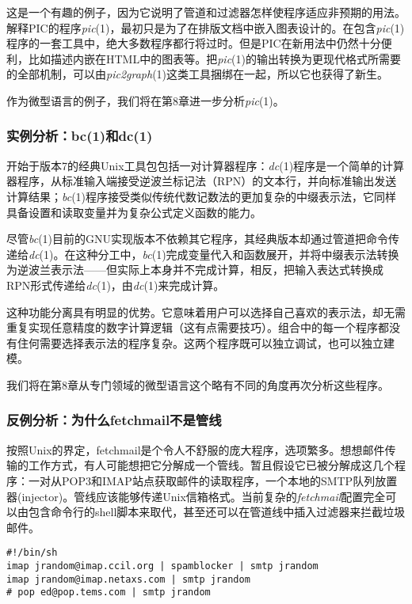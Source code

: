 \documentclass[12pt,oneside]{book}
\begin{document}
\begin{common-format}
这是一个有趣的例子，因为它说明了管道和过滤器怎样使程序适应非预期的用法。解释PIC的程序\textit{pic}(1)，最初只是为了在排版文档中嵌入图表设计的。在包含\textit{pic}(1)程序的一套工具中，绝大多数程序都行将过时。但是PIC在新用法中仍然十分便利，比如描述内嵌在HTML中的图表等。把\textit{pic}(1)的输出转换为更现代格式所需要的全部机制，可以由\textit{pic2graph}(1)这类工具捆绑在一起，所以它也获得了新生。

作为微型语言的例子，我们将在第8章进一步分析\textit{pic}(1)。

\subsubsection{实例分析：bc(1)和dc(1)}
开始于版本7的经典Unix工具包包括一对计算器程序：\textit{dc}(1)程序是一个简单的计算器程序，从标准输入端接受逆波兰标记法（RPN）的文本行，并向标准输出发送计算结果；\textit{bc}(1)程序接受类似传统代数记数法的更加复杂的中缀表示法，它同样具备设置和读取变量并为复杂公式定义函数的能力。

尽管\textit{bc}(1)目前的GNU实现版本不依赖其它程序，其经典版本却通过管道把命令传递给\textit{dc}(1)。在这种分工中，\textit{bc}(1)完成变量代入和函数展开，并将中缀表示法转换为逆波兰表示法——但实际上本身并不完成计算，相反，把输入表达式转换成RPN形式传递给\textit{dc}(1)，由\textit{dc}(1)来完成计算。

这种功能分离具有明显的优势。它意味着用户可以选择自己喜欢的表示法，却无需重复实现任意精度的数字计算逻辑（这有点需要技巧）。组合中的每一个程序都没有住何需要选择表示法的程序复杂。这两个程序既可以独立调试，也可以独立建模。

我们将在第8章从专门领域的微型语言这个略有不同的角度再次分析这些程序。


\subsubsection{反例分析：为什么fetchmail不是管线}
按照Unix的界定，fetchmail是个令人不舒服的庞大程序，选项繁多。想想邮件传输的工作方式，有人可能想把它分解成一个管线。暂且假设它已被分解成这几个程序：一对从POP3和IMAP站点获取邮件的读取程序，一个本地的SMTP队列放置器(injector)。管线应该能够传递Unix信箱格式。当前复杂的\textit{fetchmail}配置完全可以由包含命令行的shell脚本来取代，甚至还可以在管道线中插入过滤器来拦截垃圾邮件。

\begin{Verbatim}
#!/bin/sh
imap jrandom@imap.ccil.org | spamblocker | smtp jrandom
imap jrandom@imap.netaxs.com | smtp jrandom
# pop ed@pop.tems.com | smtp jrandom
\end{Verbatim}


\end{common-format}
\end{document}
